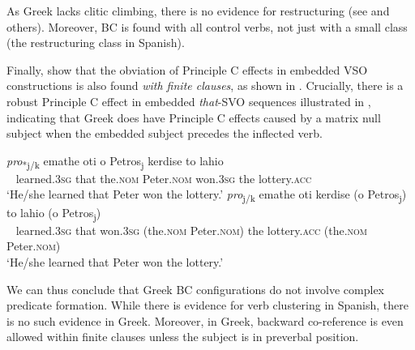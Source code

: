 \documentclass[output=paper]{langsci/langscibook}
\begin{document}
As Greek lacks clitic climbing, there is no evidence for restructuring (see \citealt{Terzi1992} and others). Moreover, BC is found with all control verbs, not just with a small class (the restructuring class in Spanish).

Finally, \citet{Tsakali2017} show that the obviation of Principle C effects in embedded VSO constructions is also found \emph{with finite clauses}, as shown in . Crucially, there is a robust Principle C effect in embedded \textit{that}{}-SVO sequences illustrated in , indicating that Greek does have Principle C effects caused by a matrix null subject when the embedded subject precedes the inflected verb.

\ea%
    \label{ex:alexiadou:25}
    \ea\label{ex:alexiadou:25a}
    \gll \textit{pro}\textsubscript{*j/k}  emathe   oti   o Petros\textsubscript{j}   kerdise   to lahio \\
         ~ learned{}.\textsc{3sg}   that the.\textsc{nom} Peter{}.\textsc{nom}   won{}.\textsc{3sg} the lottery{}.\textsc{acc} \\
    \glt ‘He/she learned that Peter won the lottery.’
    \ex\label{ex:alexiadou:25b}
        \gll \textit{pro}\textsubscript{j/k}  emathe   oti   kerdise (o Petros\textsubscript{j}) to lahio (o Petros\textsubscript{j})          \\
        ~     learned{}.\textsc{3sg}    that     won{}.\textsc{3sg} (the.\textsc{nom} Peter{}.\textsc{nom}) the lottery{}.\textsc{acc}  (the.\textsc{nom} Peter{}.\textsc{nom})        \\
        \glt ‘He/she learned that Peter won the lottery.’
    \z
\z

We can thus conclude that Greek BC configurations do not involve complex predicate formation. While there is evidence for verb clustering in Spanish, there is no such evidence in Greek. Moreover, in Greek, backward co-reference is even allowed within finite clauses unless the subject is in preverbal position.
\end{document}
